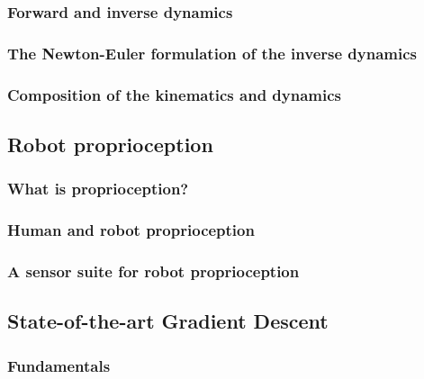 \documentclass{article}
\begin{document}
\subsubsection{Forward and inverse dynamics}
\subsubsection{The Newton-Euler formulation of the inverse dynamics}
\subsubsection{Composition of the kinematics and dynamics}
\subsection{Robot proprioception}
\subsubsection{What is proprioception?}
\subsubsection{Human and robot proprioception}
\subsubsection{A sensor suite for robot proprioception}
\subsection{State-of-the-art Gradient Descent}
\subsubsection{Fundamentals}
\end{document}
